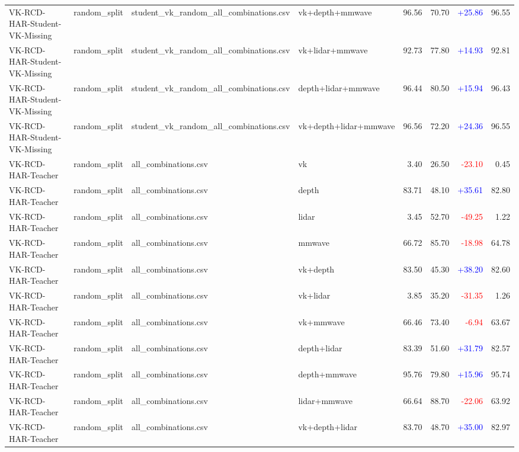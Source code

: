 \documentclass[10pt]{article}
\begin{document}
\begin{longtable}{llllrrrr}
VK-RCD-HAR-Student-VK-Missing & random\_split & student\_vk\_random\_all\_combinations.csv & vk+depth+mmwave & 96.56 & 70.70 & \textcolor{blue}{+25.86} & 96.55\\
VK-RCD-HAR-Student-VK-Missing & random\_split & student\_vk\_random\_all\_combinations.csv & vk+lidar+mmwave & 92.73 & 77.80 & \textcolor{blue}{+14.93} & 92.81\\
VK-RCD-HAR-Student-VK-Missing & random\_split & student\_vk\_random\_all\_combinations.csv & depth+lidar+mmwave & 96.44 & 80.50 & \textcolor{blue}{+15.94} & 96.43\\
VK-RCD-HAR-Student-VK-Missing & random\_split & student\_vk\_random\_all\_combinations.csv & vk+depth+lidar+mmwave & 96.56 & 72.20 & \textcolor{blue}{+24.36} & 96.55\\
VK-RCD-HAR-Teacher & random\_split & all\_combinations.csv & vk & 3.40 & 26.50 & \textcolor{red}{-23.10} & 0.45\\
VK-RCD-HAR-Teacher & random\_split & all\_combinations.csv & depth & 83.71 & 48.10 & \textcolor{blue}{+35.61} & 82.80\\
VK-RCD-HAR-Teacher & random\_split & all\_combinations.csv & lidar & 3.45 & 52.70 & \textcolor{red}{-49.25} & 1.22\\
VK-RCD-HAR-Teacher & random\_split & all\_combinations.csv & mmwave & 66.72 & 85.70 & \textcolor{red}{-18.98} & 64.78\\
VK-RCD-HAR-Teacher & random\_split & all\_combinations.csv & vk+depth & 83.50 & 45.30 & \textcolor{blue}{+38.20} & 82.60\\
VK-RCD-HAR-Teacher & random\_split & all\_combinations.csv & vk+lidar & 3.85 & 35.20 & \textcolor{red}{-31.35} & 1.26\\
VK-RCD-HAR-Teacher & random\_split & all\_combinations.csv & vk+mmwave & 66.46 & 73.40 & \textcolor{red}{-6.94} & 63.67\\
VK-RCD-HAR-Teacher & random\_split & all\_combinations.csv & depth+lidar & 83.39 & 51.60 & \textcolor{blue}{+31.79} & 82.57\\
VK-RCD-HAR-Teacher & random\_split & all\_combinations.csv & depth+mmwave & 95.76 & 79.80 & \textcolor{blue}{+15.96} & 95.74\\
VK-RCD-HAR-Teacher & random\_split & all\_combinations.csv & lidar+mmwave & 66.64 & 88.70 & \textcolor{red}{-22.06} & 63.92\\
VK-RCD-HAR-Teacher & random\_split & all\_combinations.csv & vk+depth+lidar & 83.70 & 48.70 & \textcolor{blue}{+35.00} & 82.97\\

\end{longtable}
\end{document}
